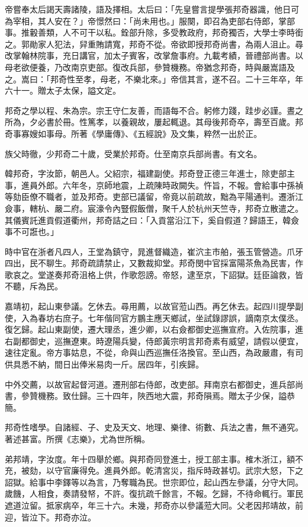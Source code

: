 \begin{pinyinscope}
帝嘗奉太后謁天壽諸陵，語及擇相。太后曰：「先皇嘗言提學張邦奇器識，他日可為宰相，其人安在？」帝憬然曰：「尚未用也。」服闋，即召為吏部右侍郎，掌部事。推轂善類，人不可干以私。銓部升除，多受教政府，邦奇獨否，大學士李時銜之。郭勛家人犯法，舁重賄請寬，邦奇不從。帝欲即授邦奇尚書，為兩人沮止。尋改掌翰林院事，充日講官，加太子賓客，改掌詹事府。九載考績，晉禮部尚書。以母老欲便養，乃改南京吏部。復改兵部，參贊機務。帝猶念邦奇，時與嚴嵩語及之。嵩曰：「邦奇性至孝，母老，不樂北來。」帝信其言，遂不召。二十三年卒，年六十一。贈太子太保，謚文定。

邦奇之學以程、朱為宗。宗王守仁友善，而語每不合。躬修力踐，跬步必謹。晝之所為，夕必書於冊。性篤孝，以養親故，屢起輒退。其母後邦奇卒，壽至百歲。邦奇事寡嫂如事母。所著《學庸傳》、《五經說》及文集，粹然一出於正。

族父時徹，少邦奇二十歲，受業於邦奇。仕至南京兵部尚書。有文名。

韓邦奇，字汝節，朝邑人。父紹宗，福建副使。邦奇登正德三年進士，除吏部主事，進員外郎。六年冬，京師地震，上疏陳時政闕失。忤旨，不報。會給事中孫禎等劾臣僚不職者，並及邦奇。吏部已議留，帝竟以前疏故，黜為平陽通判。遷浙江僉事，轄杭、嚴二府。宸濠令內豎假飯僧，聚千人於杭州天竺寺，邦奇立散遣之。其儀賓託進貢假道衢州，邦奇詰之曰：「入貢當沿江下，奚自假道？歸語王，韓僉事不可誑也。」

時中官在浙者凡四人，王堂為鎮守，晁進督織造，崔泬主市舶，張玉管營造。爪牙四出，民不聊生。邦奇疏請禁止，又數裁抑堂。邦奇閔中官採富陽茶魚為民害，作歌哀之。堂遂奏邦奇沮格上供，作歌怨謗。帝怒，逮至京，下詔獄。廷臣論救，皆不聽，斥為民。

嘉靖初，起山東參議。乞休去。尋用薦，以故官蒞山西。再乞休去。起四川提學副使，入為春坊右庶子。七年偕同官方鵬主應天鄉試，坐試錄謬誤，謫南京太僕丞。復乞歸。起山東副使，遷大理丞，進少卿，以右僉都御史巡撫宣府。入佐院事，進右副都御史，巡撫遼東。時遼陽兵變，侍郎黃宗明言邦奇素有威望，請假以便宜，速往定亂。帝方事姑息，不從，命與山西巡撫任洛換官。至山西，為政嚴肅，有司供具悉不納，間日出俸米易肉一斤。居四年，引疾歸。

中外交薦，以故官起督河道。遷刑部右侍郎，改吏部。拜南京右都御史，進兵部尚書，參贊機務。致仕歸。三十四年，陜西地大震，邦奇隕焉。贈太子少保，謚恭簡。

邦奇性嗜學。自諸經、子、史及天文、地理、樂律、術數、兵法之書，無不通究。著述甚富。所撰《志樂》，尤為世所稱。

弟邦靖，字汝度。年十四舉於鄉。與邦奇同登進士，授工部主事。榷木浙江，額不充，被劾，以守官廉得免。進員外郎。乾清宮災，指斥時政甚切。武宗大怒，下之詔獄。給事中李鐸等以為言，乃奪職為民。世宗即位，起山西左參議，分守大同。歲饑，人相食，奏請發帑，不許。復抗疏千餘言，不報。乞歸，不待命輒行。軍民遮道泣留。抵家病卒，年三十六。未幾，邦奇亦以參議蒞大同。父老因邦靖故，前迎，皆泣下。邦奇亦泣。


\end{pinyinscope}
